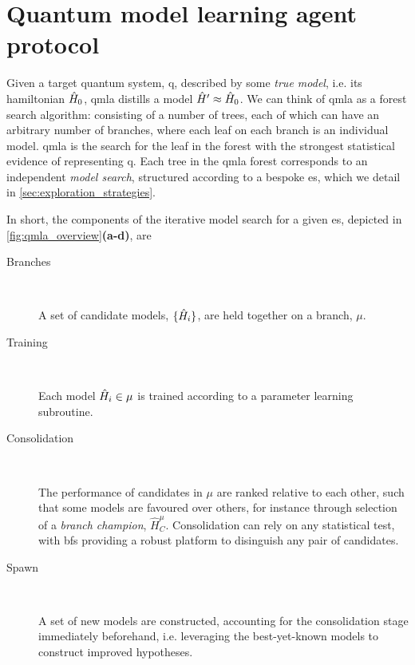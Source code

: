 \section{Quantum model learning agent protocol}\label{sec:qmla_protocol}
Given a target quantum system, \gls{q}, described by some \emph{\gls{true model}}, i.e. its \gls{hamiltonian} $\hat{H}_0$, 
    \gls{qmla} distills a \gls{model} $\hat{H}^{\prime} \approx \hat{H}_0$.
We can think of \gls{qmla} as a forest search algorithm\footnotemark:
    consisting of a number of trees, each of which can have an arbitrary number of branches, 
    where each leaf on each branch is an individual \gls{model}.
    \gls{qmla} is the search for the leaf in the forest with the 
    strongest statistical evidence of representing \gls{q}. 
Each tree in the \gls{qmla} forest corresponds to an independent \emph{\gls{model search}}, 
    structured according to a bespoke \gls{es}, which we detail in \cref{sec:exploration_strategies}. 
\par 
In short, the components of the iterative \gls{model search} for a given \gls{es}, 
    depicted in \cref{fig:qmla_overview}\textbf{(a-d)}, are
\begin{description}
    \item[Branches] \ 
    
    A set of candidate models, $\{ \hat{H}_i \}$, are held together on a branch, $\mu$. 
    
    \item[Training] \ 
    
    Each model $\hat{H}_i \in \mu$ is trained according to a parameter learning subroutine.
    
    \item[Consolidation] \ 
    
    The performance of candidates in $\mu$ are ranked relative to each other, 
        such that some models are favoured over others, for instance through selection of a \emph{branch champion}, $\hat{H}_C^{\mu}$. 
        Consolidation can rely on any statistical test, with \glspl{bf} providing a robust platform to disinguish 
        any pair of candidates.
    
    \item[Spawn] \  
    
    A set of new models are constructed, accounting for the consolidation stage immediately beforehand, 
        i.e. leveraging the best-yet-known models to construct improved hypotheses.
\end{description}

